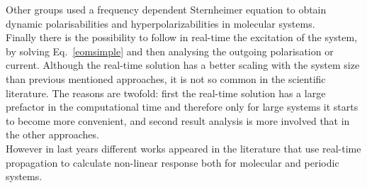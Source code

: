 Other groups used a frequency dependent Sternheimer equation to obtain dynamic polarisabilities and hyperpolarizabilities in molecular systems.\cite{andrade2007time} \\
Finally there is the possibility to follow in real-time the excitation of the system, by solving Eq.~\ref{eomsimple} and then analysing the outgoing polarisation or current. Although the real-time solution has a better scaling  with the system size  than  previous mentioned approaches, it is not so common in the scientific literature. The reasons are twofold: first the real-time solution has a large prefactor in the computational time  and therefore only for large systems it starts to become more convenient, and second result analysis is more involved that in the other approaches. \\ 
However in last years different works appeared in the literature that use real-time propagation to calculate non-linear response both for molecular\cite{takimoto:154114,ding2013efficient} and periodic systems.\cite{goncharov2013nonlinear}\\
